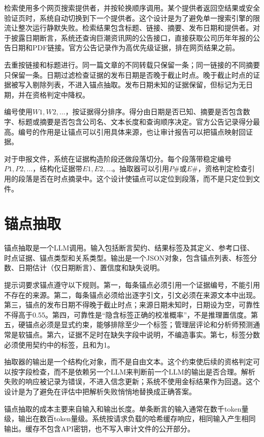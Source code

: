 检索使用多个网页搜索提供者，并按轮换顺序调用。某个提供者返回空结果或安全验证页时，系统自动切换到下一个提供者。这个设计是为了避免单一搜索引擎的限流让整次运行静默失败。检索结果包含标题、链接、摘要、发布日期和提供者。对于披露日期断言，系统还查询巨潮资讯网的公告接口，直接获取公司历年年报的公告日期和PDF链接。官方公告记录作为高优先级证据，排在网页结果之前。

去重按链接和标题进行。同一篇文章的不同转载只保留一条；同一链接的不同摘要只保留一条。日期过滤检查证据的发布日期是否晚于截止时点。晚于截止时点的证据被写入剔除列表，不进入锚点抽取。发布日期未知的证据保留，但标记为无日期，并在资格判定中降权。

编号使用$W1,W2,\dots$，按证据得分排序。得分由日期是否已知、摘要是否包含数字、标题或摘要是否包含公司名、文本长度和查询顺序决定。官方公告记录得分最高。编号的作用是让锚点可以引用具体来源，也让审计报告可以把锚点映射回证据。

对于申报文件，系统在证据构造阶段还做段落切分。每个段落带稳定编号$P1,P2,\dots$，结构化证据带$E1,E2,\dots$。抽取器可以引用$P\#$或$E\#$，资格判定检查引用的段落是否在时点摘录中。这个设计使锚点可以定位到段落，而不是只定位到文件。

\section{锚点抽取}

锚点抽取是一个LLM调用。输入包括断言契约、结果标签及其定义、参考口径、时点证据、锚点类型和关系类型。输出是一个JSON对象，包含锚点列表、标签分数、日期估计（仅日期断言）、置信度和缺失说明。

提示词要求锚点遵守以下规则。第一，每条锚点必须引用一个证据编号，不能引用不存在的来源。第二，每条锚点必须给出逐字引文，引文必须在来源文本中出现。第三，锚点的发布日期不得晚于截止时点；来源日期未知时，日期设为空，可靠性不得高于0.55。第四，可靠性是“隐含标签正确的校准概率”，不是推理置信度。第五，硬锚点必须是显式约束，能够排除至少一个标签；管理层评论和分析师预测通常是软锚点。第六，证据不足时在缺失字段中说明，不编造事实。第七，标签分数必须使用契约中的标签，且和为1。

抽取器的输出是一个结构化对象，而不是自由文本。这个约束使后续的资格判定可以按字段检查，而不是依赖另一个LLM来判断前一个LLM的输出是否合理。解析失败的响应被记录为错误，不进入信念更新；系统不使用金标结果作为回退。这个设计是为了避免在评估中把解析失败悄悄地替换成正确答案。

锚点抽取的成本主要来自输入和输出长度。单条断言的输入通常在数千token量级，输出在数百token量级。系统按请求负载的哈希缓存响应，相同输入产生相同输出。缓存不包含API密钥，也不写入审计文件的公开部分。

